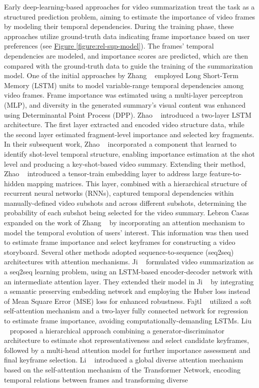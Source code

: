 Early deep-learning-based approaches for video summarization treat the task as a structured prediction problem, aiming to estimate the importance of video frames by modeling their temporal dependencies. During the training phase, these approaches utilize ground-truth data indicating frame importance based on user preferences (see \hyperref[figure:rel-sup-model]{Figure \ref{figure:rel-sup-model}}). The frames' temporal dependencies are modeled, and importance scores are predicted, which are then compared with the ground-truth data to guide the training of the summarization model. One of the initial approaches by Zhang \etal~\cite{zhang2016lstm} employed Long Short-Term Memory (LSTM) units to model variable-range temporal dependencies among video frames. Frame importance was estimated using a multi-layer perceptron (MLP), and diversity in the generated summary's visual content was enhanced using Determinantal Point Process (DPP). Zhao \etal~\cite{zhao2017hierarchical} introduced a two-layer LSTM architecture. The first layer extracted and encoded video structure data, while the second layer estimated fragment-level importance and selected key fragments. In their subsequent work, Zhao \etal~\cite{zhao2018hsa} incorporated a component that learned to identify shot-level temporal structure, enabling importance estimation at the shot level and producing a key-shot-based video summary. Extending their method, Zhao \etal~\cite{zhao2020tth} introduced a tensor-train embedding layer to address large feature-to-hidden mapping matrices. This layer, combined with a hierarchical structure of recurrent neural networks (RNNs), captured temporal dependencies within manually-defined video subshots and across different subshots, determining the probability of each subshot being selected for the video summary. Lebron Casas \etal~\cite{lebron2019attention} expanded on the work of Zhang \etal~\cite{zhang2016lstm} by incorporating an attention mechanism to model the temporal evolution of users' interest. This information was then used to estimate frame importance and select keyframes for constructing a video storyboard. Several other methods adopted sequence-to-sequence (seq2seq) architectures with attention mechanisms. Ji \etal~\cite{ji2019attentionEnDe} formulated video summarization as a seq2seq learning problem, using an LSTM-based encoder-decoder network with an intermediate attention layer. They extended their model in Ji \etal~\cite{ji2020deep} by integrating a semantic preserving embedding network and employing the Huber loss instead of Mean Square Error (MSE) loss for enhanced robustness. Fajtl \etal~\cite{fajtl2019summarizing} utilized a soft self-attention mechanism and a two-layer fully connected network for regression to estimate frame importance, avoiding computationally-demanding LSTMs. Liu \etal~\cite{liu2019learning} proposed a hierarchical approach combining a generator-discriminator architecture to estimate shot representativeness and select candidate keyframes, followed by a multi-head attention model for further importance assessment and final keyframe selection. Li \etal~\cite{li2021exploring} introduced a global diverse attention mechanism based on the self-attention mechanism of the Transformer Network, encoding temporal relations between frames and transforming diverse 